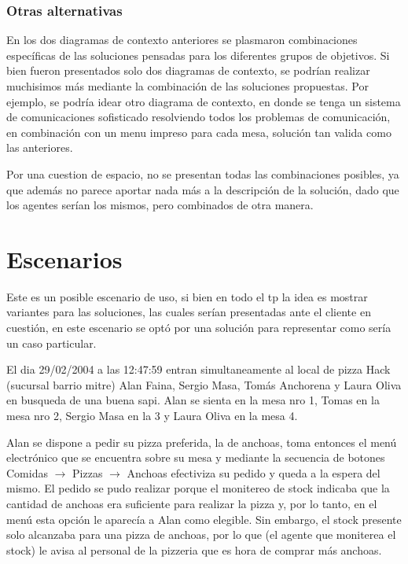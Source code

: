\documentclass[a4paper,10pt]{article}
\begin{document}
\subsubsection*{Otras alternativas} 

En los dos diagramas de contexto anteriores se plasmaron combinaciones espec\'ificas de las soluciones pensadas para los diferentes grupos de
objetivos. Si bien fueron presentados solo dos diagramas de contexto, se podr\'ian realizar muchisimos m\'as mediante la combinaci\'on de las 
soluciones propuestas. Por ejemplo, se podr\'ia idear otro diagrama de contexto, en donde se tenga un sistema de comunicaciones sofisticado resolviendo
todos los problemas de comunicaci\'on, en combinaci\'on con un menu impreso para cada mesa, soluci\'on tan valida como las anteriores.

Por una cuestion de espacio, no se presentan todas las combinaciones posibles, ya que adem\'as no parece aportar nada m\'as a la descripci\'on
de la soluci\'on, dado que los agentes ser\'ian los mismos, pero combinados de otra manera.






\newpage
\section*{Escenarios}

Este es un posible escenario de uso, si bien en todo el tp la idea es mostrar variantes para las soluciones, las cuales ser\'ian presentadas 
ante el cliente en cuesti\'on, en este escenario se opt\'o por una soluci\'on para representar como ser\'ia un caso particular.



El dia 29/02/2004 a las 12:47:59 entran simultaneamente al local de pizza Hack (sucursal barrio mitre) Alan Faina, 
Sergio Masa, Tom\'as Anchorena y Laura Oliva en busqueda de una buena sapi. 
Alan se sienta en la mesa nro 1, Tomas en la mesa nro 2, Sergio Masa en la 3 y Laura Oliva en la mesa 4. 

Alan se dispone a pedir su pizza preferida, la de anchoas, toma entonces el men\'u electr\'onico que se encuentra sobre su mesa y
mediante la secuencia de botones Comidas $\rightarrow$ Pizzas $\rightarrow$ Anchoas efectiviza su pedido y queda a la espera del mismo. El pedido se pudo 
realizar porque el monitereo de stock indicaba que la cantidad de anchoas era suficiente para realizar la pizza y, por lo tanto, en el men\'u
esta opci\'on le aparec\'ia a Alan como elegible. Sin embargo, el stock presente solo alcanzaba para una pizza de anchoas, por lo que (el agente
que moniterea el stock) le avisa al personal de la pizzeria que es hora de comprar m\'as anchoas.
\end{document}
